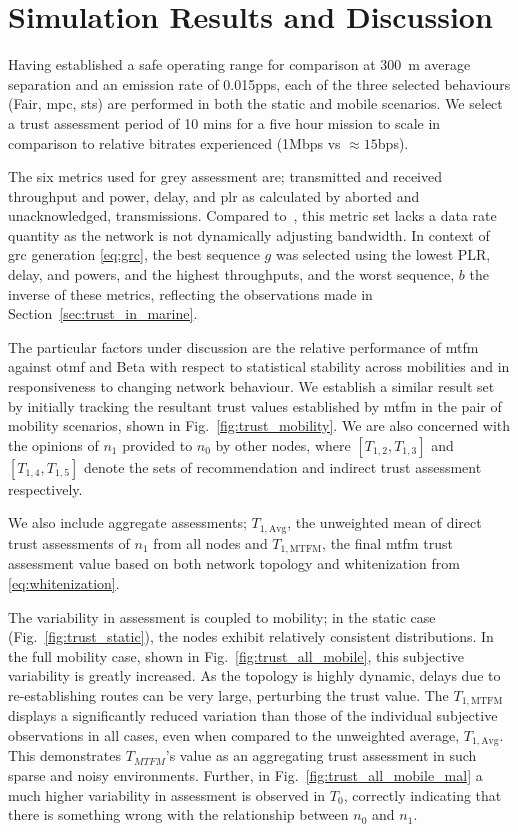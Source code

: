 \section{Simulation Results and Discussion}\label{sec:trustresultsanddiscussion}

Having established a safe operating range for comparison at \SI{300}{\meter} average separation and an emission rate of 0.015pps, each of the three selected behaviours (Fair, \gls{mpc}, \gls{sts}) are performed in both the static and mobile scenarios. 
We select a trust assessment period of 10 mins for a five hour mission to scale in comparison to relative bitrates experienced (1Mbps vs $\approx15$bps).

The six metrics used for grey assessment are; transmitted and received throughput and power, delay, and \gls{plr} as calculated by aborted and unacknowledged, transmissions.
Compared to~\cite{Guo11}, this metric set lacks a data rate quantity as the network is not dynamically adjusting bandwidth.
In context of \gls{grc} generation \eqref{eq:grc}, the best sequence $g$ was selected using the lowest PLR, delay, and powers, and the highest throughputs, and the worst sequence, $b$ the inverse of these metrics, reflecting the observations made in Section~\ref{sec:trust_in_marine}.

The particular factors under discussion are the relative performance of \gls{mtfm} against \gls{otmf} and Beta with respect to statistical stability across mobilities and in responsiveness to changing network behaviour. 
We establish a similar result set by initially tracking the resultant trust values established by \gls{mtfm} in the pair of mobility scenarios, shown in Fig.~\ref{fig:trust_mobility}.
We are also concerned with the opinions of $n_1$ provided to $n_0$ by other nodes, where $[T_{1,2},T_{1,3}]$ and $[T_{1,4},T_{1,5}]$ denote the sets of recommendation and indirect trust assessment respectively.

We also include aggregate assessments; $T_{1,\text{Avg}}$, the unweighted mean of direct trust assessments of $n_1$ from all nodes and $T_{1,\text{MTFM}}$, the final \gls{mtfm} trust assessment value based on both network topology and whitenization from \eqref{eq:whitenization}.

The variability in assessment is coupled to mobility; in the static case (Fig.~\ref{fig:trust_static}), the nodes exhibit relatively consistent distributions.
In the full mobility case, shown in Fig.~\ref{fig:trust_all_mobile}, this subjective variability is greatly increased. 
As the topology is highly dynamic, delays due to re-establishing routes can be very large, perturbing the trust value.
The $T_{1,\text{MTFM}}$ displays a significantly reduced variation than those of the individual subjective observations in all cases, even when compared to the unweighted average, $T_{1,\text{Avg}}$.
This demonstrates $T_{MTFM}$'s value as an aggregating trust assessment in such sparse and noisy environments.
Further, in Fig.~\ref{fig:trust_all_mobile_mal} a much higher variability in assessment is observed in $T_0$, correctly indicating that there is something wrong with the relationship between $n_0$ and $n_1$.

